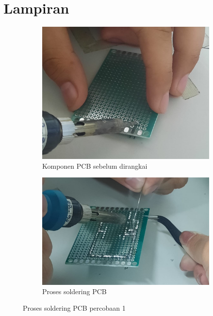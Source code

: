 \section*{Lampiran} %


\begin{figure}[H]
  \centering
  \begin{subfigure}[b]{0.4\linewidth}
    \centering
    \includegraphics[width=\linewidth]{img/modul_2/percobaan1_awal.jpg}
    \caption{Komponen PCB sebelum dirangkai\label{fig:inisub1}}
  \end{subfigure}
  \hspace{1cm}
  \begin{subfigure}[b]{0.4\linewidth}
    \centering
    \includegraphics[width=\linewidth]{img/modul_2/percobaan1_soldering.jpg}
    \caption{Proses soldering PCB\label{fig:inisub2}}
  \end{subfigure}
  \caption{Proses soldering PCB percobaan 1\label{fig:keduagambar}}
\end{figure}

